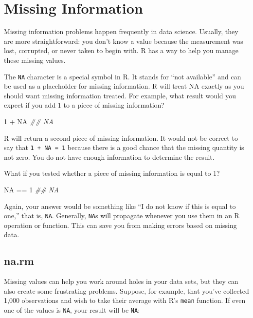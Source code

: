 \documentclass[
  letterpaper,
  DIV=11,
  numbers=noendperiod]{scrbook}
\newenvironment{Shaded}{\begin{snugshade}}{\end{snugshade}}
\newcommand{\ConstantTok}[1]{\textcolor[rgb]{0.56,0.35,0.01}{#1}}
\newcommand{\DecValTok}[1]{\textcolor[rgb]{0.68,0.00,0.00}{#1}}
\newcommand{\DocumentationTok}[1]{\textcolor[rgb]{0.37,0.37,0.37}{\textit{#1}}}
\newcommand{\SpecialCharTok}[1]{\textcolor[rgb]{0.37,0.37,0.37}{#1}}
\begin{document}
\section{Missing Information}\label{sec-missing}

Missing information problems happen frequently in data science. Usually,
they are more straightforward: you don't know a value because the
measurement was lost, corrupted, or never taken to begin with. R has a
way to help you manage these missing values.

The \texttt{NA} character is a special symbol in R. It stands for ``not
available'' and can be used as a placeholder for missing information. R
will treat NA exactly as you should want missing information treated.
For example, what result would you expect if you add 1 to a piece of
missing information?

\begin{Shaded}
\begin{Highlighting}[]
\DecValTok{1} \SpecialCharTok{+} \ConstantTok{NA}
\DocumentationTok{\#\# NA}
\end{Highlighting}
\end{Shaded}

R will return a second piece of missing information. It would not be
correct to say that \texttt{1\ +\ NA\ =\ 1} because there is a good
chance that the missing quantity is not zero. You do not have enough
information to determine the result.

What if you tested whether a piece of missing information is equal to 1?

\begin{Shaded}
\begin{Highlighting}[]
\ConstantTok{NA} \SpecialCharTok{==} \DecValTok{1}
\DocumentationTok{\#\# NA}
\end{Highlighting}
\end{Shaded}

Again, your answer would be something like ``I do not know if this is
equal to one,'' that is, \texttt{NA}. Generally, \texttt{NA}s will
propagate whenever you use them in an R operation or function. This can
save you from making errors based on missing data.

\subsection{na.rm}\label{na.rm}

Missing values can help you work around holes in your data sets, but
they can also create some frustrating problems. Suppose, for example,
that you've collected 1,000 observations and wish to take their average
with R's \texttt{mean} function. If even one of the values is
\texttt{NA}, your result will be \texttt{NA}:
\end{document}

